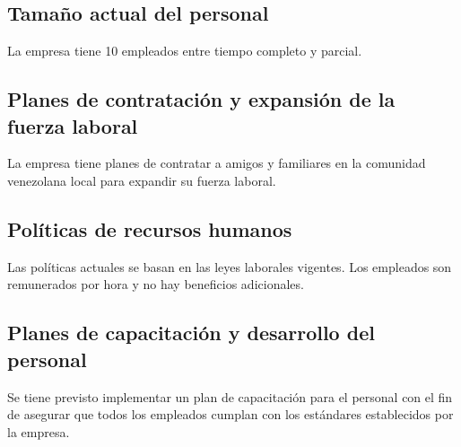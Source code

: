 \subsection{Tamaño actual del personal}

La empresa tiene 10 empleados entre tiempo completo y parcial.

\subsection{Planes de contratación y expansión de la fuerza laboral}

La empresa tiene planes de contratar a amigos y familiares en la comunidad venezolana local para expandir su fuerza laboral.

\subsection{Políticas de recursos humanos}

Las políticas actuales se basan en las leyes laborales vigentes. Los empleados son remunerados por hora y no hay beneficios adicionales.

\subsection{Planes de capacitación y desarrollo del personal}

Se tiene previsto implementar un plan de capacitación para el personal con el fin de asegurar que todos los empleados cumplan con los estándares establecidos por la empresa.